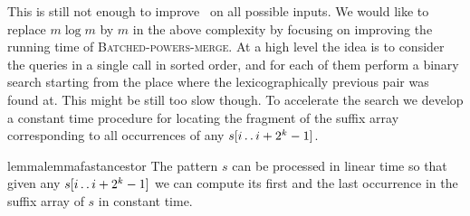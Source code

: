 \documentclass[runningheads]{llncs}
\newcommand{\twodots}{\mathinner{\ldotp\ldotp}}
\newcommand{\proc}[1]{\textnormal{\scshape#1}}
\begin{document}
This is still not enough to improve~\cite{Farach} on all possible inputs. We would like to replace $m\log m$ by $m$ in the above complexity by focusing on improving the running time of \proc{Batched-powers-merge}. At a high level the idea is to consider the queries in a single call in sorted order, and for each of them perform a binary search starting from the place where the lexicographically previous pair was found at. This might be still too slow though. To accelerate the search we develop a constant time procedure for locating the fragment of the suffix array corresponding to all occurrences of any $s[i\twodots i+2^k-1]$.

\begin{restatable}{lemma}{lemmafastancestor}
\label{lemma:fast ancestor}
The pattern $s$ can be processed in linear time so that given any $s[i\twodots i+2^k-1]$ we can compute its first and the last occurrence in the suffix array of $s$ in constant time.
\end{restatable}
\end{document}
